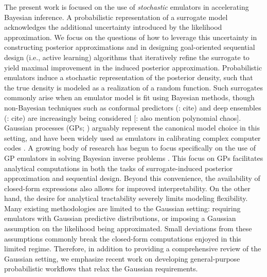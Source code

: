\documentclass[12pt]{article}
\begin{document}
The present work is focused on the use of \textit{stochastic} emulators in accelerating Bayesian inference.
A probabilistic representation of a surrogate model acknowledges the additional uncertainty introduced by the likelihood 
approximation. We focus on the questions of how to leverage this uncertainty in constructing posterior
approximations and in designing goal-oriented sequential design (i.e., active learning) algorithms
that iteratively refine the surrogate to yield maximal improvement in the induced posterior approximation. 
Probabilistic emulators induce a stochastic representation of the posterior density, such that the true density is 
modeled as a realization of a random function. Such surrogates commonly arise when an emulator
model is fit using Bayesian methods, though non-Bayesian techniques such as conformal predictors (\todo: cite) and 
deep ensembles (\todo: cite) are increasingly being considered [\todo: also mention polynomial chaos]. 
Gaussian processes (GPs; \citet{gpML}) arguably represent the canonical model choice in this setting,
 and have been widely used as emulators in calibrating complex computer codes 
\citep{design_analysis_computer_experiments,SanterCompExp,gramacy2020surrogates}. A growing body of research 
has begun to focus specifically on the use of GP emulators in solving Bayesian inverse problems
\citep{KOH,StuartTeck1,StuartTeck2,VehtariParallelGP,gp_surrogates_random_exploration,quantileApprox,FerEmulation,
KandasamyActiveLearning2015,CES,Kandasamy_2017,SinsbeckNowak,Surer2023sequential,llikRBF,
ranjan2016inverse,weightedIVAR,hydrologicalModel,VillaniAdaptiveGP,GP_PDE_priors,random_fwd_models,ActiveLearningMCMC,
MCMC_GP_proposal,trainDynamics}. 
This focus on GPs facilitates analytical computations 
in both the tasks of surrogate-induced posterior approximation and sequential design. Beyond this convenience, the availability of 
closed-form expressions also allows for improved interpretability. On the other hand, the desire for analytical tractability
severely limits modeling flexibility. Many existing methodologies are limited to the Gaussian setting: requiring emulators with 
Gaussian predictive distributions, or imposing a Gaussian assumption on the likelihood being approximated.
Small deviations from these assumptions commonly break the closed-form computations enjoyed in this limited regime.
Therefore, in addition to providing a comprehensive review of the Gaussian setting, we emphasize recent work on 
developing general-purpose probabilistic workflows that relax the Gaussian requirements.
\end{document}
